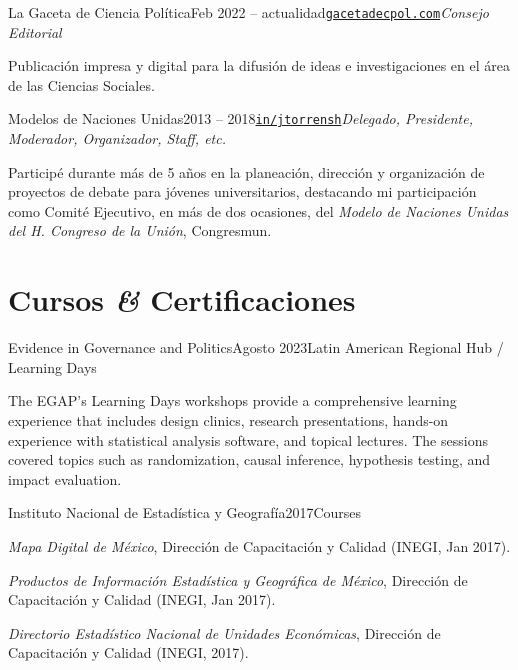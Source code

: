 \documentclass[letter]{resume}
\begin{document}
\begin{content}
\begin{position}{La Gaceta de Ciencia Política}{Feb 2022 -- actualidad}{\normalfont\href{https://gacetadecpol.com/}{\texttt{gacetadecpol.com}}}{\emph{Consejo Editorial}}{}
  \item Publicación impresa y digital para la difusión de ideas e investigaciones en el área de las Ciencias Sociales.
\end{position}

\begin{position}{Modelos de Naciones Unidas}{2013 -- 2018}{\normalfont\href{https://www.linkedin.com/in/jtorrensh/}{\texttt{in/jtorrensh}}}{\emph{Delegado, Presidente, Moderador, Organizador, Staff, etc.}}{}
  \item Participé durante más de 5 años en la planeación, dirección y organización de proyectos de debate para jóvenes universitarios, destacando mi participación como Comité Ejecutivo,  en más de dos ocasiones, del \emph{Modelo de Naciones Unidas del H. Congreso de la Unión}, Congresmun.
\end{position}

\sectionlineskip
\end{content}


\section{Cursos \textbf{\em\&} Certificaciones}

\begin{content}

\begin{position}{Evidence in Governance and Politics}{Agosto 2023}{Latin American Regional Hub / Learning Days}{}{}
\item The EGAP's Learning Days workshops provide a comprehensive learning experience that includes design clinics, research presentations, hands-on experience with statistical analysis software, and topical lectures. The sessions covered topics such as randomization, causal inference, hypothesis testing, and impact evaluation.
\end{position}

\begin{position}{Instituto Nacional de Estadística y Geografía}{2017}{Courses}{}{}
\item \emph{Mapa Digital de México}, Dirección de Capacitación y Calidad (INEGI, Jan 2017).
\item \emph{Productos de Información Estadística y Geográfica de México}, Dirección de Capacitación y Calidad (INEGI, Jan 2017).
\item \emph{Directorio Estadístico Nacional de Unidades Económicas}, Dirección de Capacitación y Calidad (INEGI, 2017).
\end{position}

\end{content}
\end{document}
